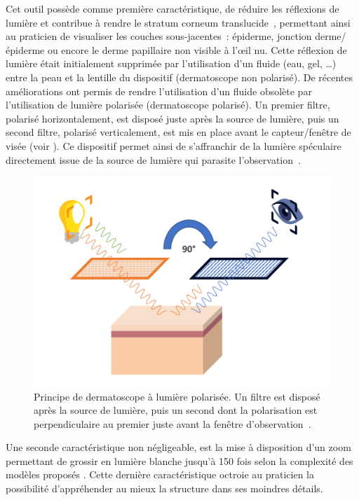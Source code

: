 Cet outil possède comme première caractéristique, de réduire les réflexions de lumière et contribue à rendre le stratum corneum translucide~\cite{Katz2001}, permettant ainsi au praticien de visualiser les couches sous-jacentes~: épiderme, jonction derme/épiderme ou encore le derme papillaire non visible à l’œil nu. Cette réflexion de lumière était initialement supprimée par l’utilisation d’un fluide (eau, gel, …) entre la peau et la lentille du dispositif (dermatoscope non polarisé). De récentes améliorations ont permis de rendre l'utilisation d'un fluide obsolète par l'utilisation de lumière polarisée (dermatoscope polarisé). Un premier filtre, polarisé horizontalement, est disposé juste après la source de lumière, puis un second filtre, polarisé verticalement, est mis en place avant le capteur/fenêtre de visée (voir ). Ce dispositif permet ainsi de s'affranchir de la lumière spéculaire directement issue de la source de lumière qui parasite l'observation~\cite{Campos-do-Carmo2008}.\par

\begin{figure}[H]
\centering
    \includegraphics[width=0.7\linewidth]{contents/chapter_2/resources/scheme_polarized_dermoscopy.pdf}
    \caption{Principe de dermatoscope à lumière polarisée. Un filtre est disposé après la source de lumière, puis un second dont la polarisation est perpendiculaire au premier juste avant la fenêtre d'observation~\cite{sonthalia2019}.}
    \label{fig:scheme_polarized_dermoscopy}
\end{figure}\par

Une seconde caractéristique non négligeable, est la mise à disposition d’un zoom permettant de grossir en lumière blanche jusqu'à 150 fois selon la complexité des modèles proposés \cite{Campos-do-Carmo2008}. Cette dernière caractéristique octroie au praticien la possibilité d’appréhender au mieux la structure dans ses moindres détails.\par

